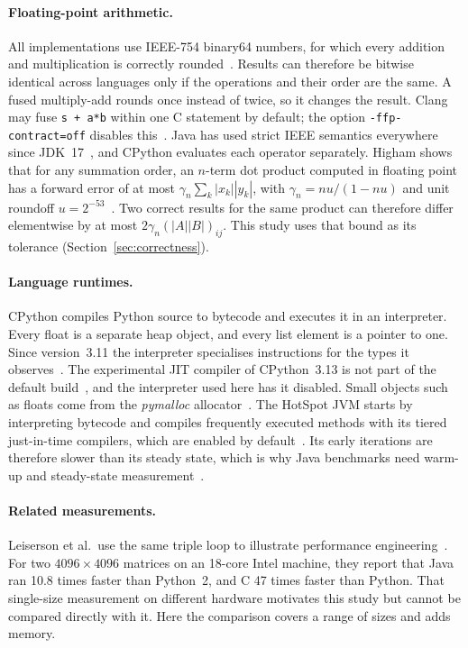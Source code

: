 \documentclass[11pt,a4paper]{article}
\begin{document}
\paragraph{Floating-point arithmetic.} All implementations use IEEE-754
binary64 numbers, for which every addition and multiplication is correctly
rounded~\cite{ieee754}. Results can therefore be bitwise identical across
languages only if the operations and their order are the same. A fused
multiply-add rounds once instead of twice, so it changes the result. Clang may
fuse \texttt{s + a*b} within one C statement by default; the option
\texttt{-ffp-contract=off} disables this~\cite{clangmanual}. Java has used strict
IEEE semantics everywhere since JDK~17~\cite{jep306}, and CPython evaluates each
operator separately. Higham shows that for any summation order, an $n$-term dot
product computed in floating point has a forward error of at most
$\gamma_n\sum_k|x_k||y_k|$, with $\gamma_n=nu/(1-nu)$ and unit roundoff
$u=2^{-53}$~\cite[Secs.~3.1, 3.5]{higham2002}. Two correct results for the same
product can therefore differ elementwise by at most $2\gamma_n(|A||B|)_{ij}$.
This study uses that bound as its tolerance (Section~\ref{sec:correctness}).

\paragraph{Language runtimes.} CPython compiles Python source to bytecode and
executes it in an interpreter. Every float is a separate heap object, and every
list element is a pointer to one. Since version~3.11 the interpreter specialises
instructions for the types it observes~\cite{pep659}. The experimental JIT
compiler of CPython~3.13 is not part of the default build~\cite{pep744}, and the
interpreter used here has it disabled. Small objects such as floats come from the
\emph{pymalloc} allocator~\cite{pythonmemory}. The HotSpot JVM starts by
interpreting bytecode and compiles frequently executed methods with its tiered
just-in-time compilers, which are enabled by default~\cite{javacmd}. Its early
iterations are therefore slower than its steady state, which is why Java
benchmarks need warm-up and steady-state measurement~\cite{georges2007}.

\paragraph{Related measurements.} Leiserson et al.\ use the same triple loop to
illustrate performance engineering~\cite{leiserson2020}. For two $4096\times4096$
matrices on an 18-core Intel machine, they report that Java ran 10.8 times faster
than Python~2, and C 47 times faster than Python. That single-size measurement on
different hardware motivates this study but cannot be compared directly with
it. Here the comparison covers a range of sizes and adds memory.
\end{document}
